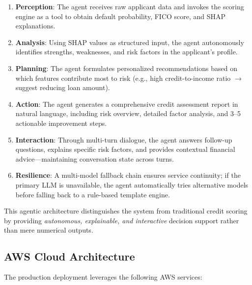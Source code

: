 \documentclass[12pt,a4paper]{article}
\begin{document}
\begin{enumerate}
    \item \textbf{Perception}: The agent receives raw applicant data and invokes the scoring engine as a tool to obtain default probability, FICO score, and SHAP explanations.
    \item \textbf{Analysis}: Using SHAP values as structured input, the agent autonomously identifies strengths, weaknesses, and risk factors in the applicant's profile.
    \item \textbf{Planning}: The agent formulates personalized recommendations based on which features contribute most to risk (e.g., high credit-to-income ratio $\rightarrow$ suggest reducing loan amount).
    \item \textbf{Action}: The agent generates a comprehensive credit assessment report in natural language, including risk overview, detailed factor analysis, and 3--5 actionable improvement steps.
    \item \textbf{Interaction}: Through multi-turn dialogue, the agent answers follow-up questions, explains specific risk factors, and provides contextual financial advice---maintaining conversation state across turns.
    \item \textbf{Resilience}: A multi-model fallback chain ensures service continuity; if the primary LLM is unavailable, the agent automatically tries alternative models before falling back to a rule-based template engine.
\end{enumerate}

This agentic architecture distinguishes the system from traditional credit scoring by providing \textit{autonomous, explainable, and interactive} decision support rather than mere numerical outputs.

\subsection{AWS Cloud Architecture}

The production deployment leverages the following AWS services:
\end{document}
